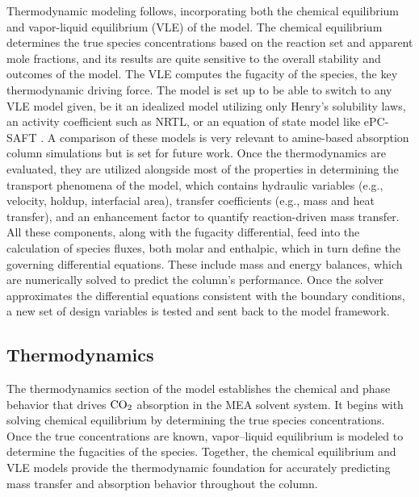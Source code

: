 \documentclass[a4paper,fleqn]{cas-sc}
\newcommand{\COtwo}{{\ce{CO2}}}
\begin{document}
    Thermodynamic modeling follows, incorporating both the chemical equilibrium and vapor-liquid equilibrium (VLE) of the model. The chemical equilibrium determines the true species concentrations based on the reaction set and apparent mole fractions, and its results are quite sensitive to the overall stability and outcomes of the model. The VLE computes the fugacity of the species, the key thermodynamic driving force. The model is set up to be able to switch to any VLE model given, be it an idealized model utilizing only Henry's solubility laws, an activity coefficient such as NRTL, or an equation of state model like ePC-SAFT \cite{Cameretti2005ModelingOriginal}. A comparison of these models is very relevant to amine-based absorption column simulations but is set for future work. Once the thermodynamics are evaluated, they are utilized alongside most of the properties in determining the transport phenomena of the model, which contains hydraulic variables (e.g., velocity, holdup, interfacial area), transfer coefficients (e.g., mass and heat transfer), and an enhancement factor to quantify reaction-driven mass transfer. All these components, along with the fugacity differential, feed into the calculation of species fluxes, both molar and enthalpic, which in turn define the governing differential equations. These include mass and energy balances, which are numerically solved to predict the column's performance. Once the solver approximates the differential equations consistent with the boundary conditions, a new set of design variables is tested and sent back to the model framework.

    \subsection{Thermodynamics}\label{subsec:thermodynamics}
    The thermodynamics section of the model establishes the chemical and phase behavior that drives $\COtwo$ absorption in the MEA solvent system. It begins with solving chemical equilibrium by determining the true species concentrations. Once the true concentrations are known, vapor–liquid equilibrium is modeled to determine the fugacities of the species. Together, the chemical equilibrium and VLE models provide the thermodynamic foundation for accurately predicting mass transfer and absorption behavior throughout the column.
\end{document}
